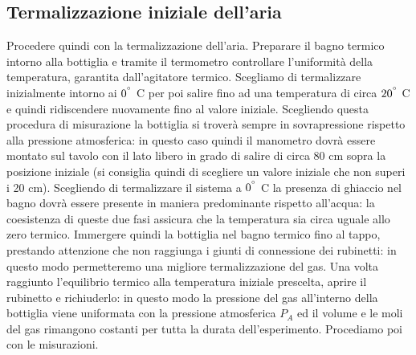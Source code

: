 \subsection{Termalizzazione iniziale dell'aria}
Procedere quindi con la termalizzazione dell'aria.
Preparare il bagno termico intorno alla bottiglia e tramite il termometro controllare l'uniformità della temperatura, garantita dall'agitatore termico.
Scegliamo di termalizzare inizialmente intorno ai $0^{\degree}$ C per poi salire fino ad una temperatura di circa $20^{\degree}$ C e quindi ridiscendere nuovamente fino al valore iniziale.
Scegliendo questa procedura di misurazione la bottiglia si troverà sempre in sovrapressione rispetto alla pressione atmosferica: in questo caso quindi il manometro dovrà essere montato sul tavolo con il lato libero in grado di salire di circa 80 cm sopra la posizione iniziale (si consiglia quindi di scegliere un valore iniziale che non superi i 20 cm).
Scegliendo di termalizzare il sistema a $0^{\degree}$ C la presenza di ghiaccio nel bagno dovrà essere presente in maniera predominante rispetto all'acqua: la coesistenza di queste due fasi assicura che la temperatura sia circa uguale allo zero termico.
Immergere quindi la bottiglia nel bagno termico fino al tappo, prestando attenzione che non raggiunga i giunti di connessione dei rubinetti: in questo modo permetteremo una migliore termalizzazione del gas.
Una volta raggiunto l'equilibrio termico alla temperatura iniziale prescelta, aprire il rubinetto e richiuderlo: in questo modo la pressione del gas all'interno della bottiglia viene uniformata con la pressione atmosferica $P_{A}$ ed il volume e le moli del gas rimangono costanti per tutta la durata dell'esperimento.
Procediamo poi con le misurazioni.\\

